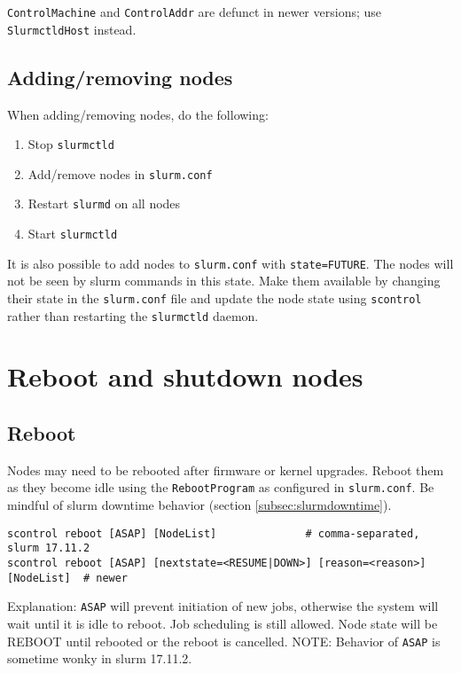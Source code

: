 \texttt{ControlMachine} and \texttt{ControlAddr} are defunct in newer versions; use \texttt{SlurmctldHost} instead.

\subsection{Adding/removing nodes} \label{subsec:addnodes}

When adding/removing nodes, do the following:
\begin{enumerate}
\item Stop \texttt{slurmctld}
\item Add/remove nodes in \texttt{slurm.conf}
\item Restart \texttt{slurmd} on all nodes
\item Start \texttt{slurmctld}
\end{enumerate}

\noindent It is also possible to add nodes to \texttt{slurm.conf} with \texttt{state=FUTURE}. The nodes will not be seen by slurm commands in this state. Make them available by changing their state in the \texttt{slurm.conf} file and update the node state using \texttt{scontrol} rather than restarting the \texttt{slurmctld} daemon.

\section{Reboot and shutdown nodes} \label{sec:slurmpowercycle}

\subsection{Reboot} \label{subsec:slurmreboot}

Nodes may need to be rebooted after firmware or kernel upgrades. Reboot them as they become idle using the \texttt{RebootProgram} as configured in \texttt{slurm.conf}. Be mindful of slurm downtime behavior (section \ref{subsec:slurmdowntime}).

\begin{verbatim}
scontrol reboot [ASAP] [NodeList]              # comma-separated, slurm 17.11.2
scontrol reboot [ASAP] [nextstate=<RESUME|DOWN>] [reason=<reason>] [NodeList]  # newer
\end{verbatim}

Explanation: \texttt{ASAP} will prevent initiation of new jobs, otherwise the system will wait until it is idle to reboot. Job scheduling is still allowed. Node state will be REBOOT until rebooted or the reboot is cancelled. NOTE: Behavior of \texttt{ASAP} is sometime wonky in slurm 17.11.2.


